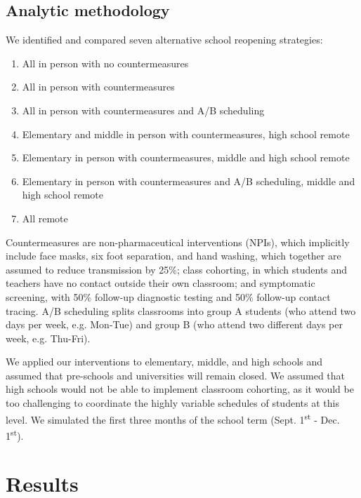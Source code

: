 \documentclass[preprint,12pt]{elsarticle}
\begin{document}
\subsection{Analytic methodology}

We identified and compared seven alternative school reopening strategies:
\begin{enumerate}
    \item All in person with no countermeasures
    \item All in person with countermeasures
    \item All in person with countermeasures and A/B scheduling
    \item Elementary and middle in person with countermeasures, high school remote
    \item Elementary in person with countermeasures, middle and high school remote
    \item Elementary in person with countermeasures and A/B scheduling, middle and high school remote
    \item All remote
\end{enumerate}

Countermeasures are non-pharmaceutical interventions (NPIs), which implicitly include face masks, six foot separation, and hand washing, which together are assumed to reduce transmission by 25\%; class cohorting, in which students and teachers have no contact outside their own classroom; and symptomatic screening, with 50\% follow-up diagnostic testing and 50\% follow-up contact tracing. A/B scheduling splits classrooms into group A students (who attend two days per week, e.g. Mon-Tue) and group B (who attend two different days per week, e.g. Thu-Fri).

We applied our interventions to elementary, middle, and high schools and assumed that pre-schools and universities will remain closed. We assumed that high schools would not be able to implement classroom cohorting, as it would be too challenging to coordinate the highly variable schedules of students at this level. We simulated the first three months of the school term (Sept. 1\textsuperscript{st} - Dec. 1\textsuperscript{st}).

\section{Results}
\end{document}
